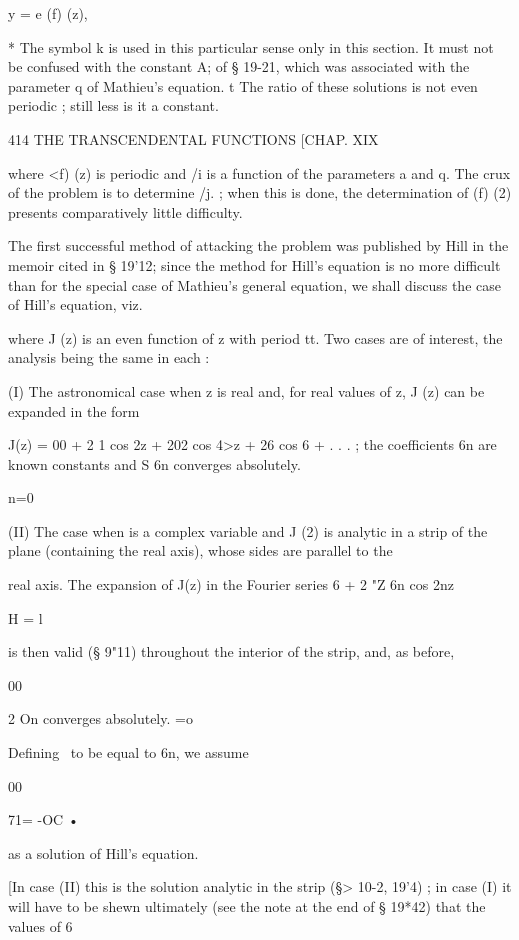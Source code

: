 y = e (f) (z), 

* The symbol k is used in this particular sense only in this section. It must not be confused 
with the constant A; of § 19-21, which was associated with the parameter q of Mathieu's equation. 
t The ratio of these solutions is not even periodic ; still less is it a constant. 



414 THE TRANSCENDENTAL FUNCTIONS [CHAP. XIX 

where <f) (z) is periodic and /i is a function of the parameters a and q. The 
crux of the problem is to determine /j. ; when this is done, the determination 
of (f) (2) presents comparatively little difficulty. 

The first successful method of attacking the problem was published by 
Hill in the memoir cited in § 19'12; since the method for Hill's equation is 
no more difficult than for the special case of Mathieu's general equation, we 
shall discuss the case of Hill's equation, viz. 

where J (z) is an even function of z with period tt. Two cases are of interest, 
the analysis being the same in each : 

(I) The astronomical case when z is real and, for real values of z, J (z) 
can be expanded in the form 

J(z) = 00 + 2 1 cos 2z + 202 cos 4>z + 26  cos 6  + . . . ; 
the coefficients 6n are known constants and S 6n converges absolutely. 

n=0 

(II) The case when   is a complex variable and J (2) is analytic in a 
strip of the plane (containing the real axis), whose sides are parallel to the 

real axis. The expansion of J(z) in the Fourier series 6  + 2 "Z 6n cos 2nz 

H = l 

is then valid (§ 9"11) throughout the interior of the strip, and, as before, 

00 

2 On converges absolutely. 
 =o 

Defining  \   to be equal to 6n, we assume 

00 

71= -OC • 

as a solution of Hill's equation. 

[In case (II) this is the solution analytic in the strip (§>  10-2, 19'4) ; in case (I) it will 
have to be shewn ultimately (see the note at the end of § 19*42) that the values of 6  

